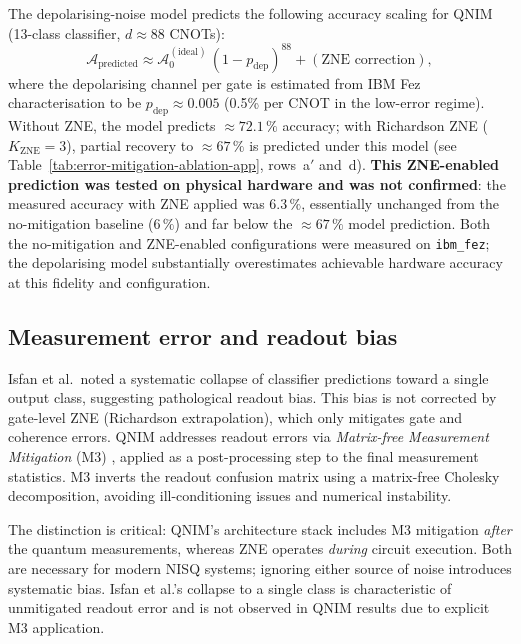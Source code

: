 \documentclass[11pt,a4paper, english]{book}
\theoremstyle{plain}
\theoremstyle{definition}
\numberwithin{equation}{chapter}
\numberwithin{figure}{chapter}
\numberwithin{table}{chapter}
\begin{document}
The depolarising-noise model predicts the following accuracy scaling for QNIM
(13-class classifier, $d \approx 88$ CNOTs):
\begin{equation}
  \label{eq:app-isfan-prediction}
  \mathcal{A}_\mathrm{predicted} \approx \mathcal{A}_0^{(\mathrm{ideal})} \,
    (1 - p_\mathrm{dep})^{88} + (\text{ZNE correction}),
\end{equation}
where the depolarising channel per gate is estimated from IBM Fez characterisation
to be $p_\mathrm{dep} \approx 0.005$ (0.5\% per CNOT in the low-error regime).
Without ZNE, the model predicts $\approx 72.1\,\%$ accuracy; with Richardson ZNE
($K_\mathrm{ZNE}=3$), partial recovery to $\approx 67\,\%$ is predicted under
this model (see Table~\ref{tab:error-mitigation-ablation-app}, rows~a$'$ and~d).
\textbf{This ZNE-enabled prediction was tested on physical hardware and was
not confirmed}: the measured accuracy with ZNE applied was $6.3\,\%$,
essentially unchanged from the no-mitigation baseline ($6\,\%$) and far
below the $\approx 67\,\%$ model prediction. Both the no-mitigation and
ZNE-enabled configurations were measured on \texttt{ibm\_fez}; the depolarising
model substantially overestimates achievable hardware accuracy at this
fidelity and configuration.

\subsection{Measurement error and readout bias}

Isfan et al.\ noted a systematic collapse of classifier predictions toward a single
output class, suggesting pathological readout bias. This bias is not corrected by
gate-level ZNE (Richardson extrapolation), which only mitigates gate and coherence
errors. QNIM addresses readout errors via \textit{Matrix-free Measurement Mitigation}
(M3) \cite{Nachman_2020}, applied as a post-processing step to the final measurement
statistics. M3 inverts the readout confusion matrix using a matrix-free Cholesky
decomposition, avoiding ill-conditioning issues and numerical instability.

The distinction is critical: QNIM's architecture stack includes M3 mitigation
\emph{after} the quantum measurements, whereas ZNE operates \emph{during} circuit
execution. Both are necessary for modern NISQ systems; ignoring either source of
noise introduces systematic bias. Isfan et al.'s collapse to a single class is
characteristic of unmitigated readout error and is not observed in QNIM results
due to explicit M3 application.
\end{document}
